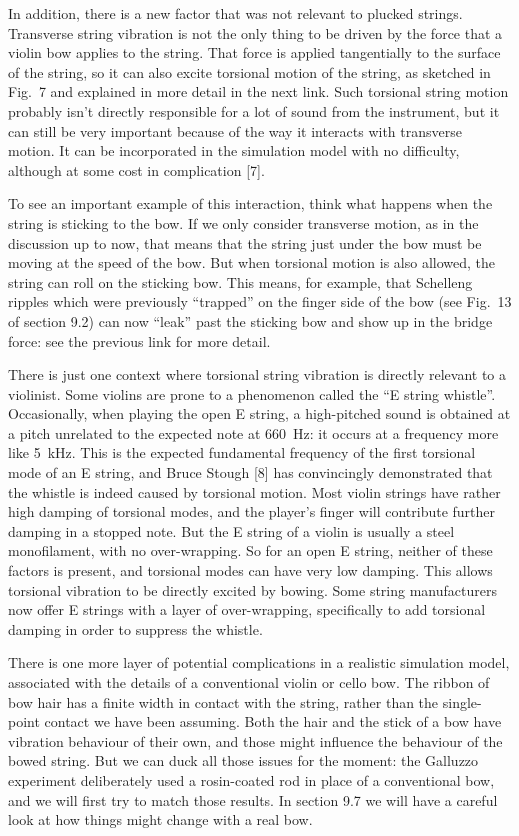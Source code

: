   In addition, there is a new factor that was not relevant to plucked strings. 
  Transverse string vibration is not the only thing to be driven by the force 
  that a violin bow applies to the string. That force is applied tangentially 
  to the surface of the string, so it can also excite torsional motion of the 
  string, as sketched in Fig.\ 7 and explained in more detail in the next link. 
  Such torsional string motion probably isn’t directly responsible for a lot of 
  sound from the instrument, but it can still be very important because of the 
  way it interacts with transverse motion. It can be incorporated in the 
  simulation model with no difficulty, although at some cost in complication 
  [7]. 

  To see an important example of this interaction, think what happens when the 
  string is sticking to the bow. If we only consider transverse motion, as in 
  the discussion up to now, that means that the string just under the bow must 
  be moving at the speed of the bow. But when torsional motion is also allowed, 
  the string can roll on the sticking bow. This means, for example, that 
  Schelleng ripples which were previously “trapped” on the finger side of the 
  bow (see Fig.\ 13 of section 9.2) can now “leak” past the sticking bow and 
  show up in the bridge force: see the previous link for more detail. 

  There is just one context where torsional string vibration is directly 
  relevant to a violinist. Some violins are prone to a phenomenon called the 
  ``E string whistle''. Occasionally, when playing the open E string, a 
  high-pitched sound is obtained at a pitch unrelated to the expected note at 
  660~Hz: it occurs at a frequency more like 5~kHz. This is the expected 
  fundamental frequency of the first torsional mode of an E string, and Bruce 
  Stough [8] has convincingly demonstrated that the whistle is indeed caused by 
  torsional motion. Most violin strings have rather high damping of torsional 
  modes, and the player's finger will contribute further damping in a stopped 
  note. But the E string of a violin is usually a steel monofilament, with no 
  over-wrapping. So for an open E string, neither of these factors is present, 
  and torsional modes can have very low damping. This allows torsional 
  vibration to be directly excited by bowing. Some string manufacturers now 
  offer E strings with a layer of over-wrapping, specifically to add torsional 
  damping in order to suppress the whistle. 

  There is one more layer of potential complications in a realistic simulation 
  model, associated with the details of a conventional violin or cello bow. The 
  ribbon of bow hair has a finite width in contact with the string, rather than 
  the single-point contact we have been assuming. Both the hair and the stick 
  of a bow have vibration behaviour of their own, and those might influence the 
  behaviour of the bowed string. But we can duck all those issues for the 
  moment: the Galluzzo experiment deliberately used a rosin-coated rod in place 
  of a conventional bow, and we will first try to match those results. In 
  section 9.7 we will have a careful look at how things might change with a 
  real bow. 

